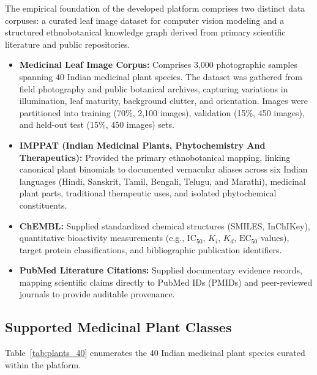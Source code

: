 The empirical foundation of the developed platform comprises two distinct data corpuses: a curated leaf image dataset for computer vision modeling and a structured ethnobotanical knowledge graph derived from primary scientific literature and public repositories.
\begin{itemize}
    \item \textbf{Medicinal Leaf Image Corpus:} Comprises 3,000 photographic samples spanning 40 Indian medicinal plant species. The dataset was gathered from field photography and public botanical archives, capturing variations in illumination, leaf maturity, background clutter, and orientation. Images were partitioned into training (70\%, 2,100 images), validation (15\%, 450 images), and held-out test (15\%, 450 images) sets.
    \item \textbf{IMPPAT (Indian Medicinal Plants, Phytochemistry And Therapeutics):} Provided the primary ethnobotanical mapping, linking canonical plant binomials to documented vernacular aliases across six Indian languages (Hindi, Sanskrit, Tamil, Bengali, Telugu, and Marathi), medicinal plant parts, traditional therapeutic uses, and isolated phytochemical constituents.
    \item \textbf{ChEMBL:} Supplied standardized chemical structures (SMILES, InChIKey), quantitative bioactivity measurements (e.g., $\mathrm{IC}_{50}$, $K_i$, $K_d$, $\mathrm{EC}_{50}$ values), target protein classifications, and bibliographic publication identifiers.
    \item \textbf{PubMed Literature Citations:} Supplied documentary evidence records, mapping scientific claims directly to PubMed IDs (PMIDs) and peer-reviewed journals to provide auditable provenance.
\end{itemize}

\subsection{Supported Medicinal Plant Classes}

Table~\ref{tab:plants_40} enumerates the 40 Indian medicinal plant species curated within the platform.

